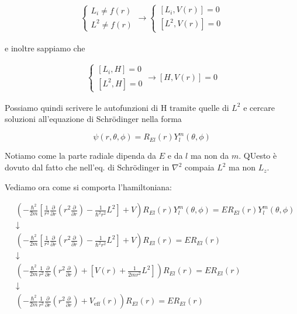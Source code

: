 \begin{align}
\left\{
\begin{array}{ccc}
L_i \neq f(r) \\
L^2 \neq f(r)
\end{array}
\right. 
\rightarrow
\left\{
\begin{array}{ccc}
\left[L_i,V(r) \right]=0 \\
\left[L^2,V(r)\right]=0
\end{array}
\right. 
\end{align}

e inoltre sappiamo che

\begin{align}
\left\{
\begin{array}{ccc}
\left[L_i,H \right]=0 \\
\left[L^2,H\right]=0
\end{array}
\right.
\rightarrow
[H,V(r)]=0
\end{align}

Possiamo quindi scrivere le autofunzioni di H tramite quelle di $L^2$ e cercare soluzioni all'equazione di Schrödinger nella forma

\begin{equation}
\psi(r,\theta,\phi)= R_{El}(r)Y_l^m(\theta,\phi)
\end{equation}

Notiamo come la parte radiale dipenda da $E$ e da $l$ ma non da $m$. QUesto è dovuto dal fatto che nell'eq. di Schrödinger in $\nabla^2$ compaia $L^2$ ma non $L_z$. \newline

Vediamo ora come si comporta l'hamiltoniana:


\begin{align}
{}&\left(-\frac{\hbar^2}{2 m}
\left[
\frac{1}{r^2}\frac{\partial}{\partial r}\left(  r^2  \frac{\partial}{\partial r}  \right) - \frac{1}{\hbar^2 r^2}L^2
\right]   + V \right) R_{El}(r)Y_l^m(\theta,\phi) = E R_{El}(r)Y_l^m(\theta,\phi) \nonumber \\
&\downarrow \nonumber \\
&\left(-\frac{\hbar^2}{2 m}
\left[
\frac{1}{r^2}\frac{\partial}{\partial r}\left(  r^2  \frac{\partial}{\partial r}  \right) - \frac{1}{\hbar^2 r^2}L^2
\right]   + V \right) R_{El}(r) = E R_{El}(r) \nonumber \\
&\downarrow \nonumber \\
& \left( -\frac{\hbar^2}{2 m} \frac{1}{r^2}\frac{\partial}{\partial r}\left(  r^2  \frac{\partial}{\partial r}  \right) + \left[ V(r) +  \frac{1}{2m r^2}L^2 \right] \right) R_{El}(r) = E R_{El}(r) \nonumber \\
&\downarrow \nonumber \\
&\left( -\frac{\hbar^2}{2 m} \frac{1}{r^2}\frac{\partial}{\partial r}\left(  r^2  \frac{\partial}{\partial r}  \right) + V_{\text{eff}}(r) \right) R_{El}(r) = E R_{El}(r)
\end{align}


